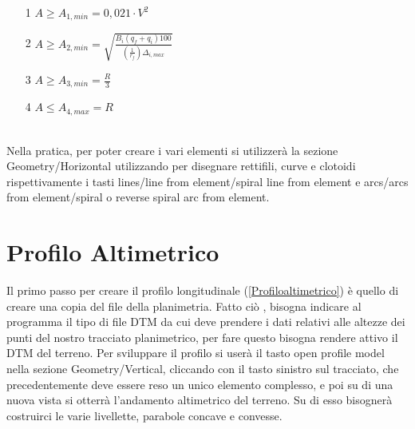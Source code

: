 \begin{minipage}[b]{0.94\textwidth}
\begin{figure}[H]
    \centering
    \caption[Caption]{}
    \label{fig:test}
\end{figure}
\end{minipage}

\begin{multicols}{2}
    \begin{itemize}
    \item[1] $A\geq A_{1,min}=0,021\cdot V^{2}$
    \item[2] $A\geq A_{2,min}=\sqrt{\frac{B_i (q_f+q_i) 100}{(\frac{1}{r_f}) \Delta_{i,max}}}$
    \end{itemize}
    \columnbreak
    \begin{itemize}
    \item[3] $A\geq A_{3,min}=\frac{R}{3}$
    \item[4] $A\leq A_{4,max}=R$
    \end{itemize}
\end{multicols}
\leavevmode\\
Nella pratica, per poter creare i vari elementi si utilizzerà la sezione Geometry/Horizontal utilizzando per disegnare rettifili, curve e clotoidi rispettivamente i tasti lines/line from element/spiral line from element e arcs/arcs from element/spiral o reverse spiral arc from element.

\newpage

\section{Profilo Altimetrico}

Il primo passo per creare il profilo longitudinale (\ref{Profiloaltimetrico}) è quello di creare una copia del file della planimetria. Fatto ciò , bisogna indicare al programma il tipo di file DTM da cui deve prendere i dati relativi alle altezze dei punti del nostro tracciato planimetrico, per fare questo bisogna rendere attivo il DTM del terreno. Per sviluppare il profilo si userà il tasto open profile model nella sezione Geometry/Vertical, cliccando con il tasto sinistro sul tracciato, che precedentemente deve essere reso un unico elemento complesso, e poi su di una nuova vista si otterrà l'andamento altimetrico del terreno. Su di esso bisognerà costruirci le varie livellette, parabole concave e convesse.

